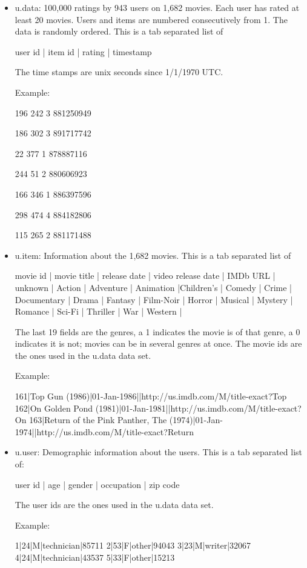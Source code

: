 \documentclass[]{svmono}
\begin{document}
\begin{itemize}

\item  u.data: 100,000 ratings by 943 users on 1,682 movies. Each
user has rated at least 20 movies. Users and items are numbered
consecutively from 1. The data is randomly ordered. This is a tab
separated list of 

user id | item id | rating | timestamp

The time stamps are unix seconds since 1/1/1970 UTC.

Example:

196	242	3	881250949

186	302	3 	891717742

22	377	1 	878887116

244	51	2 	880606923

166	346	1 	886397596

298	474	4 	884182806

115	265	2	881171488

\item  u.item: Information about the 1,682 movies. This is a tab separated list of

movie id | movie title | release date | video release date | IMDb URL | unknown | Action | Adventure | Animation |Children's | Comedy | Crime | Documentary | Drama | Fantasy | Film-Noir | Horror | Musical | Mystery | Romance | Sci-Fi | Thriller | War | Western |

The last 19 fields are the genres, a 1 indicates the movie is of that genre, a 0 indicates it is not; movies can be in several genres at once. The movie ids are the ones used in the u.data data set.

Example:

161|Top Gun (1986)|01-Jan-1986||http://us.imdb.com/M/title-exact?Top%
162|On Golden Pond (1981)|01-Jan-1981||http://us.imdb.com/M/title-exact?On%
163|Return of the Pink Panther, The (1974)|01-Jan-1974||http://us.imdb.com/M/title-exact?Return%

\item   u.user: Demographic information about the users. This is a tab
separated list of:

user id | age | gender | occupation | zip code

The user ids are the ones used in the u.data data set.

Example:

1|24|M|technician|85711 
2|53|F|other|94043 
3|23|M|writer|32067 
4|24|M|technician|43537 
5|33|F|other|15213

\end{itemize}
\end{document}
